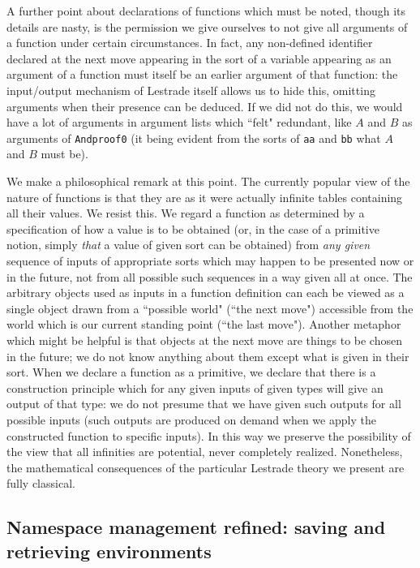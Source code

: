 \documentclass[12pt]{article}
\begin{document}
A further point about declarations of functions which must be noted, though its details are nasty, is the permission we give ourselves to not give all arguments of a function under certain circumstances.  In fact, any non-defined identifier declared at the next move appearing in the sort of a variable appearing as an argument of a function must itself be an earlier argument of that function:  the input/output mechanism of Lestrade itself allows us to hide this, omitting arguments when their presence can be deduced.  If we did not do this, we would have a lot of arguments in argument lists which ``felt" redundant, like $A$ and $B$ as arguments of {\tt Andproof0} (it being evident from the sorts of {\tt aa} and {\tt bb} what $A$ and $B$ must be).

We make a philosophical remark at this point.  The currently popular view of the nature of functions is that they are as it were actually infinite tables containing all their values.  We resist this.  We regard a function as determined by a  specification of how a value is to be obtained (or, in the case of a primitive notion,  simply {\em that\/} a value of given sort can be obtained) from {\em any given} sequence of inputs of appropriate sorts which may happen to be presented now or in the future, not from all possible such sequences in a way given all at once.  The arbitrary objects used as inputs in a function definition can each be viewed as a single object drawn from a ``possible world" (``the next move") accessible from the world which is our current standing point (``the last move").  Another metaphor which might be helpful is that objects at the next move are things to be chosen in the future;  we do not know anything about them except what is given in their sort.  When we declare a function as a primitive, we declare that there is a construction principle which for
any given inputs of given types will give an output of that type:  we do not presume that we have given such outputs for all possible inputs (such outputs are produced on demand when we apply the constructed function to specific inputs).  In this way we preserve the possibility of the view that all infinities are potential, never completely realized.  Nonetheless, the mathematical consequences of the particular Lestrade theory we present are fully classical.

\subsection{Namespace management refined:  saving and retrieving environments}
\end{document}
